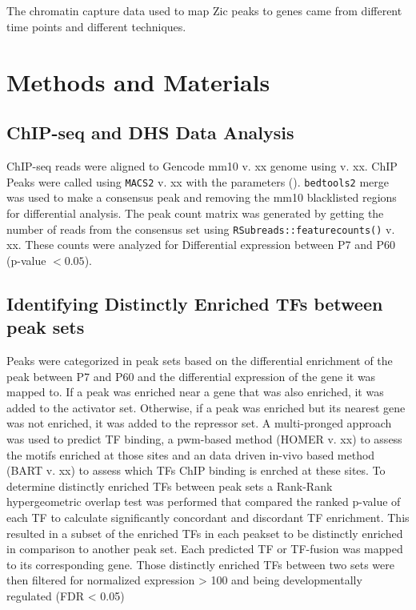 \documentclass[fleqn,10pt,twocolumn]{wlscirep}
\begin{document}
\subsection*{}
The chromatin capture data used to map Zic peaks to genes came from different time points and different techniques. 

\section*{Methods and Materials}
\subsection*{ChIP-seq and DHS Data Analysis}
ChIP-seq reads were aligned to Gencode mm10 v. xx genome using  v. xx. ChIP Peaks were called using \texttt{MACS2} v. xx with the parameters ().  \texttt{bedtools2} merge was used to make a consensus peak and removing the mm10 blacklisted regions \cite{} for differential analysis. The peak count matrix was generated by getting the number of reads from the consensus set using \texttt{RSubreads::featurecounts()} v. xx. These counts were analyzed for Differential expression between P7 and P60  (p-value $< 0.05$). 


\subsection*{Identifying Distinctly Enriched  TFs between peak sets}
Peaks were categorized in peak sets based on the differential enrichment of the peak between P7 and P60 and the differential expression of the gene it was mapped to. If a peak was enriched near a gene that was also enriched, it was added to the activator set. Otherwise, if a peak was enriched but its nearest gene was not enriched, it was added to the repressor set. A multi-pronged approach was used to predict TF binding, a pwm-based method (HOMER v. xx) \cite{} to assess the motifs enriched at those sites and an data driven in-vivo based method (BART v. xx) \cite{Zhenjiawang2018BART:Profiles, Ma2021BARTweb:Analysis} to assess which TFs ChIP binding is enrched at these sites. To determine distinctly enriched TFs between peak sets a Rank-Rank hypergeometric overlap test \cite{RRHO} was performed that compared the ranked p-value of each TF  to calculate significantly concordant and discordant TF enrichment. This resulted in a subset of the enriched TFs in each peakset to be distinctly enriched in comparison to another peak set.  Each predicted TF or TF-fusion was mapped to its corresponding gene. Those distinctly enriched TFs between two sets were then filtered for normalized expression > 100 and being developmentally regulated (FDR < 0.05)
\end{document}
